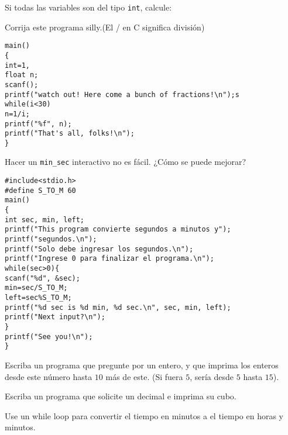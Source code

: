 \documentclass[spanish,addpoints,answers,a4paper]{exam}
\begin{document}
\begin{questions}

\question  Si todas las variables son del tipo \texttt{int}, calcule:


\question Corrija este programa silly.\qquad(El / en C significa división)

\begin{verbatim}
main()
{
int=1,
float n;
scanf();
printf("watch out! Here come a bunch of fractions!\n");s
while(i<30)
n=1/i;
printf("%f", n);
printf("That's all, folks!\n");
}
\end{verbatim}

\question Hacer un \texttt{min_sec} interactivo no es fácil. ¿Cómo se puede mejorar?

\begin{verbatim}
#include<stdio.h>
#define S_TO_M 60
main()
{
int sec, min, left;
printf("This program convierte segundos a minutos y");
printf("segundos.\n");
printf("Solo debe ingresar los segundos.\n");
printf("Ingrese 0 para finalizar el programa.\n");
while(sec>0){
scanf("%d", &sec);
min=sec/S_TO_M;
left=sec%S_TO_M;
printf("%d sec is %d min, %d sec.\n", sec, min, left);
printf("Next input?\n");
}
printf("See you!\n");
}
\end{verbatim}

\question Escriba un programa que pregunte por un entero, y que imprima los enteros desde este número hasta $10$ más de este. (Si fuera $5$, sería desde $5$ hasta $15$).

\question Escriba un programa que solicite un decimal e imprima su cubo.

\question Use un while loop para convertir el tiempo en minutos a el tiempo en horas y minutos.


\end{questions}
\end{document}
